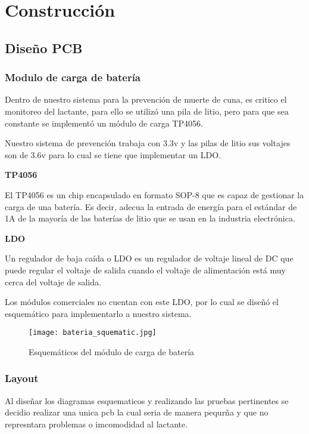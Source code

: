 \section{Construcción}
\subsection{Diseño PCB}

\subsubsection{Modulo de carga de batería}
Dentro de nuestro sistema para la prevención de muerte de cuna, es critico el monitoreo del lactante, para ello se utilizó una pila de litio, pero para que sea constante se implementó un módulo de carga TP4056.

Nuestro sistema de prevención trabaja con 3.3v y las pilas de litio sus voltajes son de 3.6v para lo cual se tiene que implementar un LDO.

\textbf{TP4056}

El TP4056 es un chip encapsulado en formato SOP-8 que es capaz de gestionar la carga de una batería. Es decir, adecua la entrada de energía para el estándar de 1A de la mayoría de las baterías de litio que se usan en la industria electrónica.

\textbf{LDO}

Un regulador de baja caída o LDO es un regulador de voltaje lineal de DC que puede regular el voltaje de salida cuando el voltaje de alimentación está muy cerca del voltaje de salida.

Los módulos comerciales no cuentan con este LDO, por lo cual se diseñó el esquemático para implementarlo a nuestro sistema.

\begin{figure}[htp!]
    \centering
    \texttt{[image: bateria\_squematic.jpg]}
    \caption{Esquemáticos del módulo de carga de batería}
    \label{fig: bateria}
\end{figure}\FloatBarrier

\subsubsection{Layout}

Al diseñar los diagramas esquematicos y realizando las pruebas pertinentes se decidio realizar una unica pcb la cual seria de manera pequrña y que no represntara problemas o imcomodidad al lactante.

